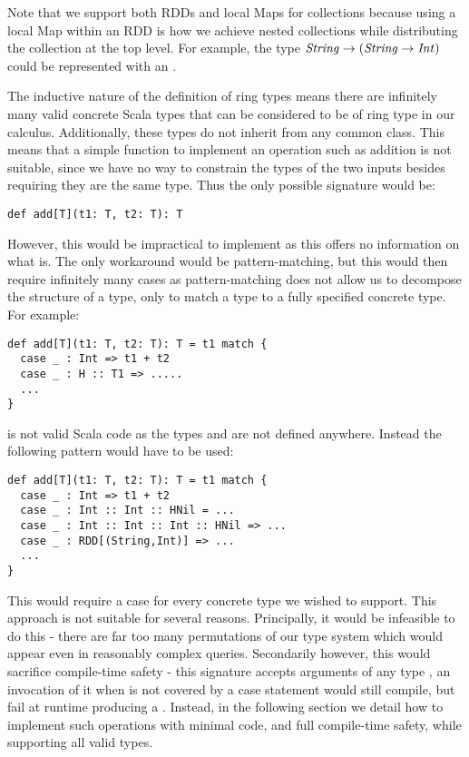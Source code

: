 Note that we support both RDDs and local Maps for collections because using a local Map within an RDD is how we achieve nested collections while distributing the collection at the top level. For example, the type $\textrm{\textit{String}} \rightarrow (\textrm{\textit{String}} \rightarrow \textrm{\textit{Int}})$ could be represented with an .

\vs The inductive nature of the definition of ring types means there are infinitely many valid concrete Scala types that can be considered to be of ring type in our calculus. Additionally, these types do not inherit from any common class. This means that a simple function to implement an operation such as addition is not suitable, since we have no way to constrain the types of the two inputs besides requiring they are the same type. Thus the only possible signature would be:
\vs\begin{lstlisting}
def add[T](t1: T, t2: T): T
\end{lstlisting}\vs
However, this would be impractical to implement as this offers no information on what  is. The only workaround would be pattern-matching, but this would then require infinitely many cases as pattern-matching does not allow us to decompose the structure of a type, only to match a type to a fully specified concrete type. For example:
\vs\begin{lstlisting}
def add[T](t1: T, t2: T): T = t1 match {
  case _ : Int => t1 + t2
  case _ : H :: T1 => .....
  ...
}
\end{lstlisting}\vs
is not valid Scala code as the types  and  are not defined anywhere. Instead the following pattern would have to be used:
\vs\begin{lstlisting}
def add[T](t1: T, t2: T): T = t1 match {
  case _ : Int => t1 + t2
  case _ : Int :: Int :: HNil = ...
  case _ : Int :: Int :: Int :: HNil => ...
  case _ : RDD[(String,Int)] => ...
  ...
}
\end{lstlisting}\vs
This would require a case for every concrete type we wished to support. This approach is not suitable for several reasons. Principally, it would be infeasible to do this - there are far too many permutations of our type system which would appear even in reasonably complex queries. Secondarily however, this would sacrifice compile-time safety - this signature accepts arguments of any type , an invocation of it when  is not covered by a case statement would still compile, but fail at runtime producing a . Instead, in the following section we detail how to implement such operations with minimal code, and full compile-time safety, while supporting all valid types.

